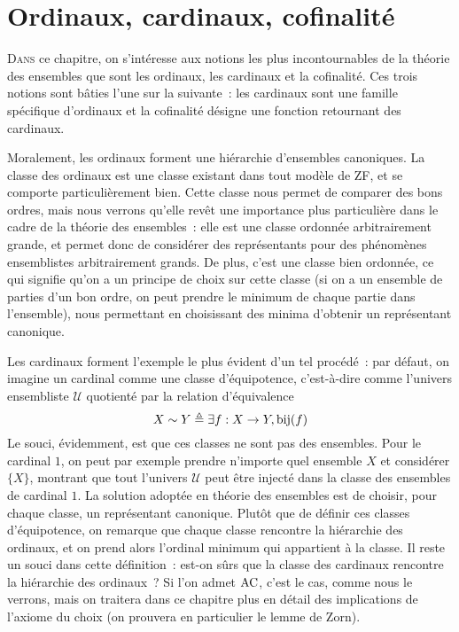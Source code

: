 \chapter{Ordinaux, cardinaux, cofinalité}
\label{chp.ordinaux}

\minitoc

\lettrine{D}{ans} ce chapitre, on s'intéresse aux notions les plus
incontournables de la théorie des ensembles que sont les ordinaux, les cardinaux
et la cofinalité. Ces trois notions sont bâties l'une sur la suivante~: les
cardinaux sont une famille spécifique d'ordinaux et la cofinalité désigne une
fonction retournant des cardinaux.

Moralement, les ordinaux forment une hiérarchie d'ensembles canoniques. La
classe des ordinaux est une classe existant dans tout modèle de ZF, et se
comporte particulièrement bien. Cette classe nous permet de comparer des bons
ordres, mais nous verrons qu'elle revêt une importance plus particulière dans le
cadre de la théorie des ensembles~: elle est une classe ordonnée arbitrairement
grande, et permet donc de considérer des représentants pour des phénomènes
ensemblistes arbitrairement grands. De plus, c'est une classe bien ordonnée,
ce qui signifie qu'on a un principe de choix sur cette classe (si on a un
ensemble de parties d'un bon ordre, on peut prendre le minimum de chaque partie
dans l'ensemble), nous permettant en choisissant des minima d'obtenir un
représentant canonique.

Les cardinaux forment l'exemple le plus évident d'un tel procédé~: par défaut,
on imagine un cardinal comme une classe d'équipotence, c'est-à-dire comme
l'univers ensembliste $\mathcal U$ quotienté par la relation d'équivalence
\[X\sim Y \triangleq \exists f : X \to Y, \mathrm{bij}(f)\]
Le souci, évidemment, est que ces classes ne sont pas des ensembles. Pour le
cardinal $1$, on peut par exemple prendre n'importe quel ensemble $X$ et
considérer $\{X\}$, montrant que tout l'univers $\mathcal U$ peut être injecté
dans la classe des ensembles de cardinal $1$. La solution adoptée en théorie des
ensembles est de choisir, pour chaque classe, un représentant canonique.
Plutôt que de définir ces classes d'équipotence, on remarque que chaque classe
rencontre la hiérarchie des ordinaux, et on prend alors l'ordinal minimum qui
appartient à la classe. Il reste un souci dans cette définition~: est-on sûrs
que la classe des cardinaux rencontre la hiérarchie des ordinaux~? Si l'on
admet $\operatorname{AC}$, c'est le cas, comme nous le verrons, mais on traitera dans ce
chapitre plus en détail des implications de l'axiome du choix (on prouvera
en particulier le lemme de Zorn).

